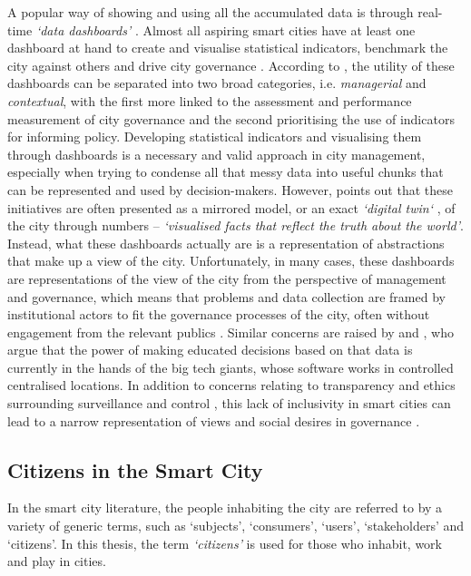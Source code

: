 A popular way of showing and using all the accumulated data is through real-time \textit{`data dashboards'} \citep{kitchin_real-time_2014,kitchin_knowing_2015}. Almost all aspiring smart cities have at least one dashboard at hand to create and visualise statistical indicators, benchmark the city against others and drive city governance \citep{kitchin_knowing_2015}. According to \citet{kitchin_knowing_2015}, the utility of these dashboards can be separated into two broad categories, i.e. \textit{managerial} and \textit{contextual}, with the first more linked to the assessment and performance measurement of city governance and the second prioritising the use of indicators for informing policy. Developing statistical indicators and visualising them through dashboards is a necessary and valid approach in city management, especially when trying to condense all that messy data into useful chunks that can be represented and used by decision-makers. However, \citet[p. 24]{kitchin_knowing_2015} points out that these initiatives are often presented as a mirrored model, or an exact \textit{`digital twin`} \citep{bolton_gemini_2018}, of the city through numbers -- \textit{`visualised facts that reflect the truth about the world'}. Instead, what these dashboards actually are is a representation of abstractions that make up a view of the city. Unfortunately, in many cases, these dashboards are representations of the view of the city from the perspective of management and governance, which means that problems and data collection are framed by institutional actors to fit the governance processes of the city, often without engagement from the relevant publics \citep{asad_creating_2017}. Similar concerns are raised by \cite{greenfield_against_2013} and \cite{townsend_smart_2013}, who argue that the power of making educated decisions based on that data is currently in the hands of the big tech giants, whose software works in controlled centralised locations. In addition to concerns relating to transparency and ethics surrounding surveillance and control \citep{van_dijck_datafication_2014,tufekci_engineering_2014}, this lack of inclusivity in smart cities can lead to a narrow representation of views and social desires in governance \citep{tufekci_big_2014,mcmillan_data_2016}.

\subsection{Citizens in the Smart City}
In the smart city literature, the people inhabiting the city are referred to by a variety of generic terms, such as `subjects', `consumers', `users', `stakeholders' and `citizens'. In this thesis, the term \textit{`citizens'} is used for those who inhabit, work and play in cities.


